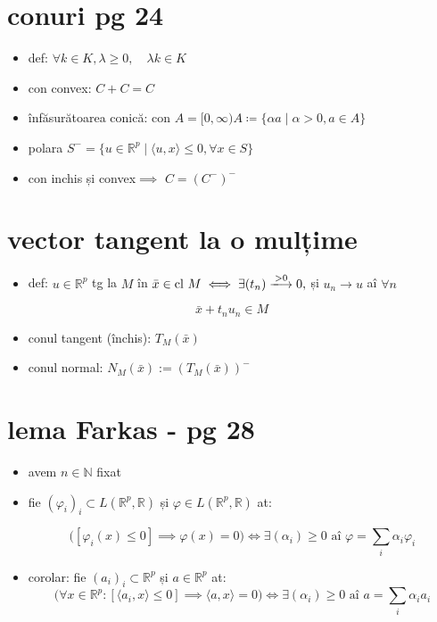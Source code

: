 \documentclass[11pt]{article}
\newcommand{\R}{\mathbb{R}}
\begin{document}
\section*{conuri pg 24}
\label{sec:orgd9f1f06}
\begin{itemize}
\item def: \(\forall k \in K, \lambda \ge 0,\quad  \lambda k \in K\)
\item con convex: \(C+C=C\)
\item înfăsurătoarea conică: \(\text{con }A = [0, \infty) A \coloneqq \{ \alpha a \mid \alpha>0, a\in A  \}\)
\item polara \(S^- = \{ u \in \R^p \mid \langle u, x \rangle \leq 0, \forall x \in S \}\)
\item con inchis și convex\(\implies\) \(C= (C^-)^-\)
\end{itemize}

\section*{vector tangent la o mulțime}
\label{sec:orgae9ae11}
\begin{itemize}
\item def: \(u \in \R^p\) tg la \(M\) în \(\bar{x} \in \text{cl }M  \iff \exists (t_n) \xlongrightarrow{>0} 0,\) și
\(u_n\to u\) aî \(\forall n\)
\end{itemize}
\[\bar{x} + t_n u_n \in M \]
\begin{itemize}
\item conul tangent (închis): \(T_M(\bar{x})\)
\item conul normal: \(N_M(\bar{x}) := \left(T_M(\bar{x}) \right)^-\)
\end{itemize}
\section*{lema Farkas - pg 28}
\label{sec:org86d44f9}
\begin{itemize}
\item avem \(n \in \mathbb{N}\) fixat
\item fie \((\varphi_i)_i \subset L(\R^p, \R)\) și \(\varphi \in L(\R^p, \R)\) at:

 \[\Big([\varphi_i(x) \leq 0 ] \implies \varphi(x) = 0\Big) \iff \exists (\alpha_i)\geq 0 
\text{ aî } \varphi = \sum_i \alpha_i \varphi_i \]
\item corolar: fie \((a_i)_i \subset \R^p\) și \(a \in \R^p\) at:
\[ \Big( \forall x \in \R^p :  [\langle a_i, x \rangle \leq 0 ] \implies \langle a, x \rangle = 0\Big) \iff 
\exists (\alpha_i)\geq 0 \text{ aî } a = \sum_i \alpha_i a_i \]
\end{itemize}
\end{document}
